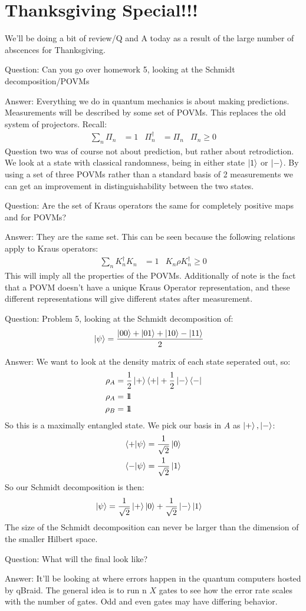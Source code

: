 \section*{Thanksgiving Special!!!}
We'll be doing a bit of review/Q and A today as a result of the large number of abscences for Thanksgiving.

Question: Can you go over homework 5, looking at the Schmidt decomposition/POVMs

Answer: Everything we do in quantum mechanics is about making predictions. Measurements will be described by some set of POVMs. This replaces the old system of projectors. Recall:
\begin{align*}
	\sum_n \Pi_n &= 1 &
	\Pi_n^\dagger &= \Pi_n &
	\Pi_n \geq 0
\end{align*}
Question two was of course not about prediction, but rather about retrodiction. We look at a state with classical randomness, being in either state $\ket{1}$ or $\ket{-}$.
By using a set of three POVMs rather than a standard basis of 2 measurements we can get an improvement in distinguishability between the two states.

Question: Are the set of Kraus operators the same for completely positive maps and for POVMs?

Answer: They are the same set. This can be seen because the following relations apply to Kraus operators:
\begin{align*}
	\sum_n K_n^\dagger K_n &= 1 & 
	K_n\rho K_n^\dagger \geq 0
\end{align*}
This will imply all the properties of the POVMs. Additionally of note is the fact that a POVM doesn't have a unique Kraus Operator representation, and these different representations will give different states after measurement.

Question: Problem 5, looking at the Schmidt decomposition of:
\begin{align*}
	\ket{\psi} &= \frac{\ket{00} + \ket{01} + \ket{10} - \ket{11}}{2}
\end{align*}

Answer: We want to look at the density matrix of each state seperated out, so:
\begin{align*}
	\rho_A &= \frac{1}{2}\ket{+}\bra{+} + \frac{1}{2}\ket{-}\bra{-} \\
	\rho_A &= 1\!\!1 \\
	\rho_B &= 1\!\!1
\end{align*}
So this is a maximally entangled state. We pick our basis in $A$ as $\ket{+},\ket{-}$:
\begin{align*}
	\bra{+}\ket{\psi} &= \frac{1}{\sqrt{2}}\ket{0} \\
	\bra{-}\ket{\psi} &= \frac{1}{\sqrt{2}}\ket{1}
\end{align*}
So our Schmidt decomposition is then:
\begin{align*}
	\ket{\psi} &= \frac{1}{\sqrt{2}}\ket{+}\ket{0} + \frac{1}{\sqrt{2}}\ket{-}\ket{1}
\end{align*}
The size of the Schmidt decomposition can never be larger than the dimension of the smaller Hilbert space.

Question: What will the final look like?

Answer: It'll be looking at where errors happen in the quantum computers hosted by qBraid. The general idea is to run n $X$ gates to see how the error rate scales with the number of gates.
Odd and even gates may have differing behavior.
